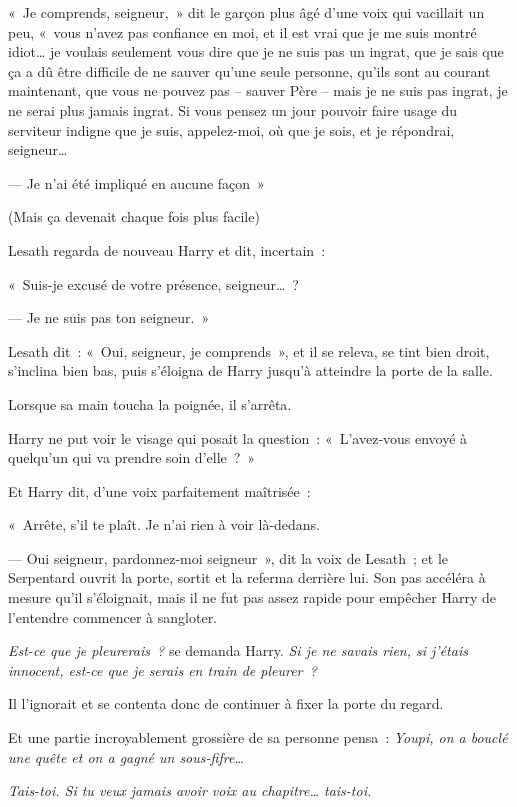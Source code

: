 «~Je comprends, seigneur,~» dit le garçon plus âgé d'une voix qui vacillait un peu, «~vous n'avez pas confiance en moi, et il est vrai que je me suis montré idiot… je voulais seulement vous dire que je ne suis pas un ingrat, que je sais que ça a dû être difficile de ne sauver qu'une seule personne, qu'ils sont au courant maintenant, que vous ne pouvez pas -- sauver Père -- mais je ne suis pas ingrat, je ne serai plus jamais ingrat.
Si vous pensez un jour pouvoir faire usage du serviteur indigne que je suis, appelez-moi, où que je sois, et je répondrai, seigneur…

--- Je n'ai été impliqué en aucune façon~»

(Mais ça devenait chaque fois plus facile)

Lesath regarda de nouveau Harry et dit, incertain~:

«~Suis-je excusé de votre présence, seigneur…~?

--- Je ne suis pas ton seigneur.~»

Lesath dit~: «~Oui, seigneur, je comprends~», et il se releva, se tint bien droit, s'inclina bien bas, puis s'éloigna de Harry jusqu'à atteindre la porte de la salle.

Lorsque sa main toucha la poignée, il s'arrêta.

Harry ne put voir le visage qui posait la question~: «~L'avez-vous envoyé à quelqu'un qui va prendre soin d'elle~?~»

Et Harry dit, d'une voix parfaitement maîtrisée~:

«~Arrête, s'il te plaît.
Je n'ai rien à voir là-dedans.

--- Oui seigneur, pardonnez-moi seigneur~», dit la voix de Lesath~; et le Serpentard ouvrit la porte, sortit et la referma derrière lui.
Son pas accéléra à mesure qu'il s'éloignait, mais il ne fut pas assez rapide pour empêcher Harry de l'entendre commencer à sangloter.

\emph{Est-ce que je pleurerais~?} se demanda Harry.
\emph{Si je ne savais rien, si j'étais innocent, est-ce que je serais en train de pleurer~?}

Il l'ignorait et se contenta donc de continuer à fixer la porte du regard.

Et une partie incroyablement grossière de sa personne pensa~: \emph{Youpi, on a bouclé une quête et on a gagné un sous-fifre…}

\emph{Tais-toi.
Si tu veux jamais avoir voix au chapitre… tais-toi.}


